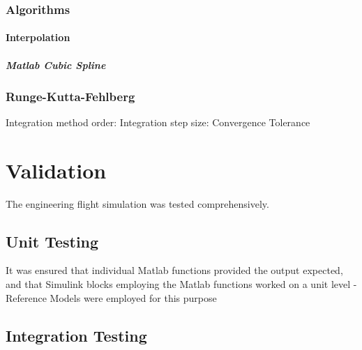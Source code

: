 \documentclass[]{article}
\let\oldparagraph\paragraph
\renewcommand{\paragraph}[1]{\oldparagraph{#1}\mbox{}}
\let\oldsubparagraph\subparagraph
\renewcommand{\subparagraph}[1]{\oldsubparagraph{#1}\mbox{}}
\begin{document}
\subsubsection{Algorithms}\label{algorithms}

\paragraph{Interpolation}\label{interpolation}

\subparagraph{Matlab Cubic Spline}\label{matlab-cubic-spline}

\paragraph{}\label{section}

\subsubsection{Runge-Kutta-Fehlberg}\label{runge-kutta-fehlberg}

Integration method order: Integration step size: Convergence Tolerance

\section{Validation}\label{validation-1}

The engineering flight simulation was tested comprehensively.

\subsection{Unit Testing}\label{unit-testing}

It was ensured that individual Matlab functions provided the output
expected, and that Simulink blocks employing the Matlab functions worked
on a unit level - Reference Models were employed for this purpose

\subsection{Integration Testing}\label{integration-testing}
\end{document}
